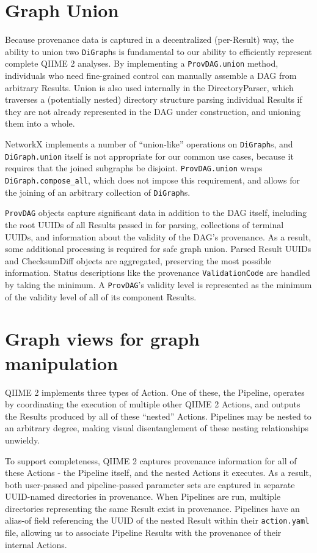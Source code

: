 \section{Graph Union}

Because provenance data is captured in a decentralized (per-Result) way, the
ability to union two \texttt{DiGraph}s is fundamental to our ability to efficiently
represent complete QIIME 2 analyses. By implementing a \texttt{ProvDAG.union} method,
individuals who need fine-grained control can manually assemble a DAG from
arbitrary Results. Union is also used internally in the DirectoryParser, which
traverses a (potentially nested) directory structure parsing individual Results
if they are not already represented in the DAG under construction, and unioning
them into a whole.

NetworkX implements a number of “union-like” operations on \texttt{DiGraph}s, and
\texttt{DiGraph.union} itself is not appropriate for our common use cases, because it
requires that the joined subgraphs be disjoint. \texttt{ProvDAG.union} wraps
\texttt{DiGraph.compose\_all}, which does not impose this requirement, and allows for the
joining of an arbitrary collection of \texttt{DiGraph}s.

\texttt{ProvDAG} objects capture significant data in addition to the DAG itself,
including the root UUIDs of all Results passed in for parsing, collections of
terminal UUIDs, and information about the validity of the DAG’s provenance. As a
result, some additional processing is required for safe graph union. Parsed
Result UUIDs and ChecksumDiff objects are aggregated, preserving the most
possible information. Status descriptions like the provenance \texttt{ValidationCode} are
handled by taking the minimum. A \texttt{ProvDAG}'s validity level is represented as the
minimum of the validity level of all of its component Results.


\section{Graph views for graph manipulation}

QIIME 2 implements three types of Action. One of these, the Pipeline, operates
by coordinating the execution of multiple other QIIME 2 Actions, and outputs the
Results produced by all of these “nested” Actions. Pipelines may be nested to an
arbitrary degree, making visual disentanglement of these nesting relationships
unwieldy.

To support completeness, QIIME 2 captures provenance information for all of
these Actions - the Pipeline itself, and the nested Actions it executes. As a
result, both user-passed and pipeline-passed parameter sets are captured in
separate UUID-named directories in provenance. When Pipelines are run, multiple
directories representing the same Result exist in provenance. Pipelines have an
alias-of field referencing the UUID of the nested Result within their
\texttt{action.yaml} file, allowing us to associate Pipeline Results with the provenance
of their internal Actions. 

